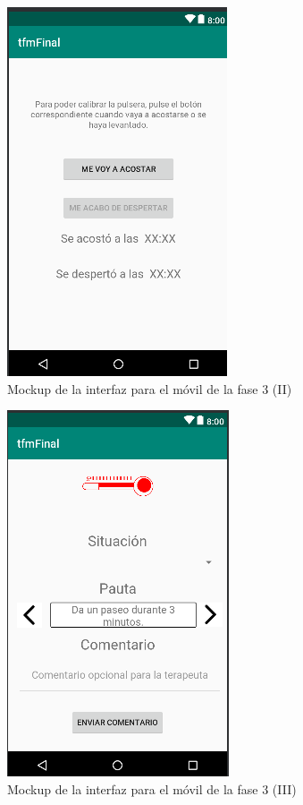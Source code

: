 \begin{figure}[!htbp]
    \centering
    \includegraphics[scale=0.6]{Imagenes/anxA13.png}
    \caption[Mockup de la interfaz para el móvil de la fase 3 (II)]{Mockup de la interfaz para el móvil de la fase 3 (II)}
    \label{fig:mockup13}
\end{figure}

\begin{figure}[!htbp]
    \centering
    \includegraphics[scale=0.6]{Imagenes/anxA14.png}
    \caption[Mockup de la interfaz para el móvil de la fase 3 (III)]{Mockup de la interfaz para el móvil de la fase 3 (III)}
    \label{fig:mockup14}
\end{figure}

